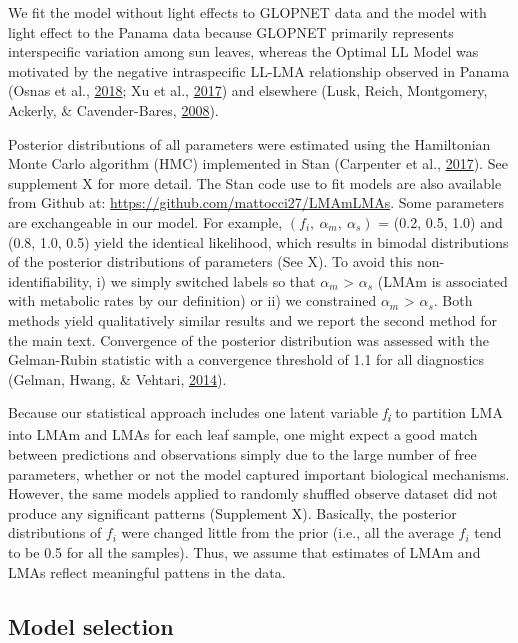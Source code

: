 \documentclass[12pt,]{article}
\theoremstyle{definition}
\theoremstyle{definition}
\theoremstyle{definition}
\theoremstyle{remark}
\begin{document}
We fit the model without light effects to GLOPNET data and the model
with light effect to the Panama data because GLOPNET primarily
represents interspecific variation among sun leaves, whereas the Optimal
LL Model was motivated by the negative intraspecific LL-LMA relationship
observed in Panama (Osnas et al.,
\protect\hyperlink{ref-Osnas2018}{2018}; Xu et al.,
\protect\hyperlink{ref-Xu2017}{2017}) and elsewhere (Lusk, Reich,
Montgomery, Ackerly, \& Cavender-Bares,
\protect\hyperlink{ref-Lusk2008}{2008}).

Posterior distributions of all parameters were estimated using the
Hamiltonian Monte Carlo algorithm (HMC) implemented in Stan (Carpenter
et al., \protect\hyperlink{ref-Carpenter2017}{2017}). See supplement X
for more detail. The Stan code use to fit models are also available from
Github at: \url{https://github.com/mattocci27/LMAmLMAs}. Some parameters
are exchangeable in our model. For example,
\((f_i, \ \alpha_m, \ \alpha_s)\) = (0.2, 0.5, 1.0) and (0.8, 1.0, 0.5)
yield the identical likelihood, which results in bimodal distributions
of the posterior distributions of parameters (See X). To avoid this
non-identifiability, i) we simply switched labels so that \(\alpha_m\)
\textgreater{} \(\alpha_s\) (LMAm is associated with metabolic rates by
our definition) or ii) we constrained \(\alpha_m\) \textgreater{}
\(\alpha_s\). Both methods yield qualitatively similar results and we
report the second method for the main text. Convergence of the posterior
distribution was assessed with the Gelman-Rubin statistic with a
convergence threshold of 1.1 for all diagnostics (Gelman, Hwang, \&
Vehtari, \protect\hyperlink{ref-Gelman2014}{2014}).

Because our statistical approach includes one latent variable
\emph{f\textsubscript{i}} to partition LMA into LMAm and LMAs for each
leaf sample, one might expect a good match between predictions and
observations simply due to the large number of free parameters, whether
or not the model captured important biological mechanisms. However, the
same models applied to randomly shuffled observe dataset did not produce
any significant patterns (Supplement X). Basically, the posterior
distributions of \(f_i\) were changed little from the prior (i.e., all
the average \(f_i\) tend to be 0.5 for all the samples). Thus, we assume
that estimates of LMAm and LMAs reflect meaningful pattens in the data.

\hypertarget{model-selection}{%
\subsection{Model selection}\label{model-selection}}
\end{document}
